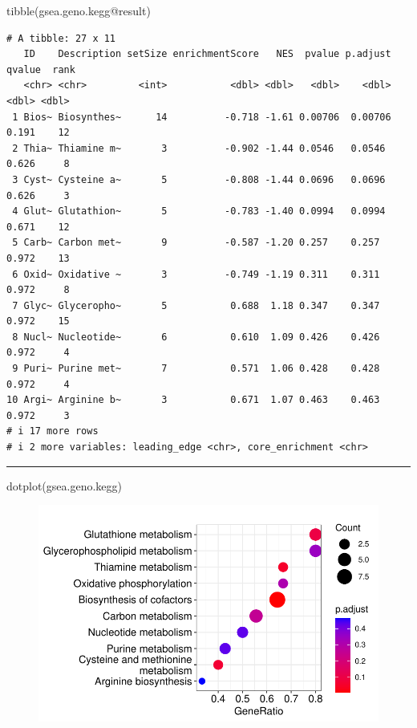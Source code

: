 \documentclass[
  24px,
  letterpaper,
  DIV=11,
  numbers=noendperiod]{scrartcl}
\newenvironment{Shaded}{\begin{snugshade}}{\end{snugshade}}
\newcommand{\FunctionTok}[1]{\textcolor[rgb]{0.28,0.35,0.67}{#1}}
\newcommand{\NormalTok}[1]{\textcolor[rgb]{0.00,0.23,0.31}{#1}}
\newcommand{\SpecialCharTok}[1]{\textcolor[rgb]{0.37,0.37,0.37}{#1}}
\begin{document}
\begin{Shaded}
\begin{Highlighting}[]
\FunctionTok{tibble}\NormalTok{(gsea.geno.kegg}\SpecialCharTok{@}\NormalTok{result)}
\end{Highlighting}
\end{Shaded}

\begin{verbatim}
# A tibble: 27 x 11
   ID    Description setSize enrichmentScore   NES  pvalue p.adjust qvalue  rank
   <chr> <chr>         <int>           <dbl> <dbl>   <dbl>    <dbl>  <dbl> <dbl>
 1 Bios~ Biosynthes~      14          -0.718 -1.61 0.00706  0.00706  0.191    12
 2 Thia~ Thiamine m~       3          -0.902 -1.44 0.0546   0.0546   0.626     8
 3 Cyst~ Cysteine a~       5          -0.808 -1.44 0.0696   0.0696   0.626     3
 4 Glut~ Glutathion~       5          -0.783 -1.40 0.0994   0.0994   0.671    12
 5 Carb~ Carbon met~       9          -0.587 -1.20 0.257    0.257    0.972    13
 6 Oxid~ Oxidative ~       3          -0.749 -1.19 0.311    0.311    0.972     8
 7 Glyc~ Glyceropho~       5           0.688  1.18 0.347    0.347    0.972    15
 8 Nucl~ Nucleotide~       6           0.610  1.09 0.426    0.426    0.972     4
 9 Puri~ Purine met~       7           0.571  1.06 0.428    0.428    0.972     4
10 Argi~ Arginine b~       3           0.671  1.07 0.463    0.463    0.972     3
# i 17 more rows
# i 2 more variables: leading_edge <chr>, core_enrichment <chr>
\end{verbatim}

\begin{center}\rule{0.5\linewidth}{0.5pt}\end{center}

\begin{Shaded}
\begin{Highlighting}[]
\FunctionTok{dotplot}\NormalTok{(gsea.geno.kegg)}
\end{Highlighting}
\end{Shaded}

\begin{figure}[H]

{\centering \includegraphics{index_files/figure-pdf/unnamed-chunk-39-1.pdf}

}

\end{figure}
\end{document}
